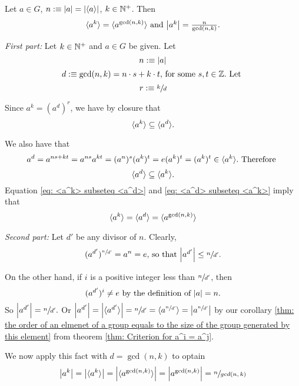 \begin{thm}Let $a\in G$, $n:\equiv \abs{a}=\abs{\langle a \rangle}$, $k\in \mathbb{N}^+$. Then
  \begin{equation}
    \la a^k \ra = \la a^{\gcd(n,k)} \ra $ and $ \abs{a ^k} = \frac{n}{\gcd(n,k)}.
  \end{equation}
\end{thm}
\begin{prf} \emph{First part:}
  Let $k\in \mathbb{N}^+$ and $a\in G$ be given. Let
  \begin{equation}
    n :\equiv \abs{a}
  \end{equation}
  \begin{equation}
    d:\equiv \gcd(n,k) = n\cdot s + k \cdot t, $ for some $s,t \in \integer. $ Let $
  \end{equation}
  \begin{equation}
    r :\equiv \sfrac{k}{d}
  \end{equation}

  Since $a^k = (a^d)^r$, we have by closure that  \begin{equation}
    \label{eq: <a^k> subseteq <a^d>}
    \langle a^k \rangle \subseteq {\langle a^d \rangle}.
  \end{equation}

  We also have that
  \begin{equation}
    a^d = a^{ns+kt} = a^{ns}a^{kt} = (a^n)^s (a^k)^t = e (a^k)^t = (a^k)^t \in \la a^k \ra. $ Therefore $
  \end{equation}
  \begin{equation}
    \label{eq: <a^d> subseteq <a^k>}
    \langle a^d \rangle \subseteq \langle a^k \rangle.
  \end{equation}
  Equation \eqref{eq: <a^k> subseteq <a^d>} and \eqref{eq: <a^d> subseteq <a^k>} imply that
  \begin{equation}
    \langle a^k \rangle = \langle a^d \rangle = \langle a^{\gcd(n,k)} \rangle
  \end{equation}

  \emph{Second part:} Let $d'$ be any divisor of $n$. Clearly,
  \begin{equation}
    (a^{d'})^{\sfrac{n}{d'}} = a^n =e, $ so that $ \abs{a^{d'}} \leq \sfrac{n}{d'}.
  \end{equation}

  On the other hand, if $i$ is a positive integer less than $\sfrac{n}{d'}$, then
  \begin{equation}
    (a^{d'})^i \neq e $ by the definition of $ \abs{a}=n.
  \end{equation}
  So $\abs{a^{d'}} = \sfrac{n}{d'}.$ Or $ \abs{a^{d'}} = \abs{\langle a^{d'} \rangle} = \sfrac{n}{d'} = \langle a^{\sfrac{n}{d'}} \rangle = \abs{a^{\sfrac{n}{d'}}}$  by our corollary  \ref{thm: the order of an elmenet of a group equals to the size of the group generated by this element} from theorem \ref{thm: Criterion for a^i = a^j}.

  We now apply this fact with $d=\gcd(n,k)$ to optain
  \begin{equation}
    \abs{a^k} = \abs{\langle a^k \rangle} = \abs{ \langle a^{\gcd (n,k)} \rangle } = \abs{a^{\gcd(n,k)}} = \sfrac{n}{gcd(n,k)}
  \end{equation}
\end{prf}


